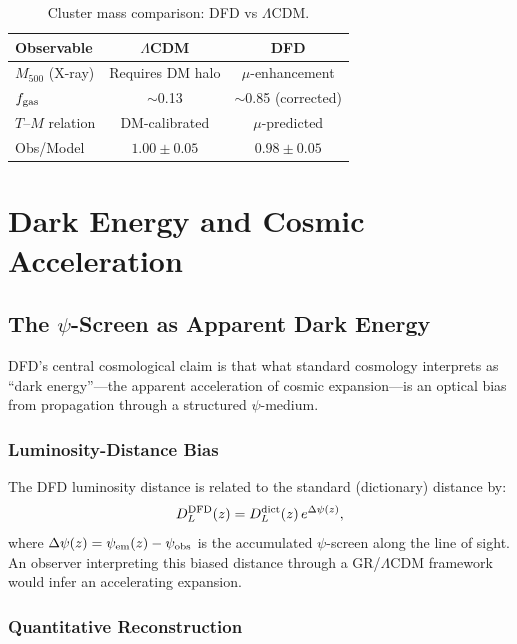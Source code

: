 \documentclass[aps,prd,twocolumn,superscriptaddress,nofootinbib]{revtex4-2}
\begin{document}
\begin{table}[h]
\centering
\caption{Cluster mass comparison: DFD vs $\Lambda$CDM.}
\label{tab:cluster-comparison}
\begin{tabular}{lcc}
\toprule
Observable & $\Lambda$CDM & DFD \\
\midrule
$M_{500}$ (X-ray) & Requires DM halo & $\mu$-enhancement \\
$f_{\rm gas}$ & $\sim$0.13 & $\sim$0.85 (corrected) \\
$T$--$M$ relation & DM-calibrated & $\mu$-predicted \\
Obs/Model & $1.00 \pm 0.05$ & $0.98 \pm 0.05$ \\
\bottomrule
\end{tabular}
\end{table}

\section{Dark Energy and Cosmic Acceleration}\label{sec:dark-energy}

\subsection{The $\psi$-Screen as Apparent Dark Energy}

DFD's central cosmological claim is that what standard cosmology
interprets as ``dark energy''---the apparent acceleration of
cosmic expansion---is an optical bias from propagation through a
structured $\psi$-medium.

\subsubsection{Luminosity-Distance Bias}

The DFD luminosity distance is related to the standard (dictionary)
distance by:
\begin{equation}\label{eq:DL-bias}
D_L^{\rm DFD}(z) = D_L^{\rm dict}(z)\,e^{\Delta\psi(z)},
\end{equation}
where $\Delta\psi(z) = \psi_{\rm em}(z) - \psi_{\rm obs}$ is the
accumulated $\psi$-screen along the line of sight. An observer
interpreting this biased distance through a GR/$\Lambda$CDM framework
would infer an accelerating expansion.

\subsubsection{Quantitative Reconstruction}
\end{document}
